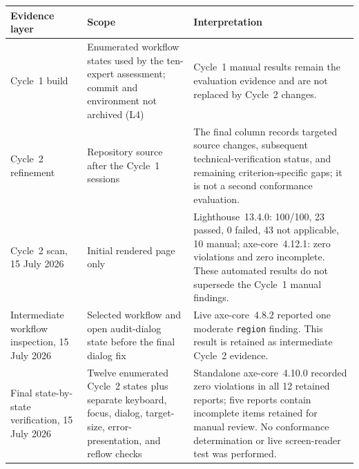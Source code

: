 \documentclass[10pt]{article}
\begin{document}
\begin{center}\footnotesize
\begin{tabularx}{\textwidth}{|p{3.1cm}|p{4.2cm}|>{\raggedright\arraybackslash}X|}
\hline\textbf{Evidence layer} & \textbf{Scope} & \textbf{Interpretation}\\\hline
Cycle~1 build & Enumerated workflow states used by the ten-expert assessment; commit and environment not archived (L4) & Cycle~1 manual results remain the evaluation evidence and are not replaced by Cycle~2 changes.\\\hline
Cycle~2 refinement & Repository source after the Cycle~1 sessions & The final column records targeted source changes, subsequent technical-verification status, and remaining criterion-specific gaps; it is not a second conformance evaluation.\\\hline
Cycle~2 scan, 15 July 2026 & Initial rendered page only & Lighthouse~13.4.0: 100/100, 23 passed, 0 failed, 43 not applicable, 10 manual; axe-core~4.12.1: zero violations and zero incomplete. These automated results do not supersede the Cycle~1 manual findings.\\\hline
Intermediate workflow inspection, 15 July 2026 & Selected workflow and open audit-dialog state before the final dialog fix & Live axe-core~4.8.2 reported one moderate \texttt{region} finding. This result is retained as intermediate Cycle~2 evidence.\\\hline
Final state-by-state verification, 15 July 2026 & Twelve enumerated Cycle~2 states plus separate keyboard, focus, dialog, target-size, error-presentation, and reflow checks & Standalone axe-core~4.10.0 recorded zero violations in all 12 retained reports; five reports contain incomplete items retained for manual review. No conformance determination or live screen-reader test was performed.\\\hline
\end{tabularx}
\end{center}
\end{document}
